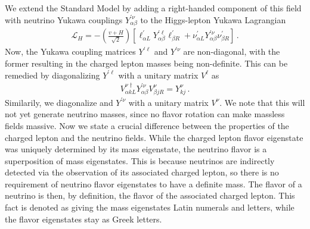 We extend the Standard Model by adding a right-handed component of this field with neutrino Yukawa couplings $Y_{\alpha \beta}^{\prime \nu}$ to the Higgs-lepton Yukawa Lagrangian 
\begin{align}
    \mathcal{L}_{H}=-\left( \frac{v + H}{\sqrt{2}} \right) \left[\ell_{\alpha L}^{\prime} Y_{\alpha \beta}^{\prime \ell} \ell_{\beta R}^{\prime} + \nu_{\alpha L}^{\prime} Y_{\alpha \beta}^{\prime \nu} \nu_{\beta R}^{\prime}\right]\,.
\end{align}
Now, the Yukawa coupling matrices $Y^{\prime \ell}$ and $Y^{\prime \nu}$ are non-diagonal, with the former resulting in the charged lepton masses being non-definite. 
This can be remedied by diagonalizing $Y^{\prime \ell}$ with a unitary matrix $V^\ell$ as
\begin{align}
    V_{\alpha k L}^{\nu \dagger} Y^{\prime \nu}_{\alpha \beta} V_{\beta j R}^{\nu}=Y^{\nu}_{kj} \,.
\end{align}
Similarily, we diagonalize and $Y^{\prime \nu}$ with a unitary matrix $V^\nu$. We note that this will not yet generate neutrino masses, 
since no flavor rotation can make massless fields massive.
Now we state a crucial difference between the properties of the charged lepton and the neutrino fields.
While the charged lepton flavor eigenstate was uniquely determined by its mass eigenstate, the neutrino flavor is a superposition of mass eigenstates. 
This is because neutrinos are indirectly detected via the observation of its associated charged lepton, so there is no requirement of neutrino flavor eigenstates to have a definite mass. 
The flavor of a neutrino is then, by definition, the flavor of the associated charged lepton. 
This fact is denoted as giving the mass eigenstates Latin numerals and letters, while the flavor eigenstates stay as Greek letters.

